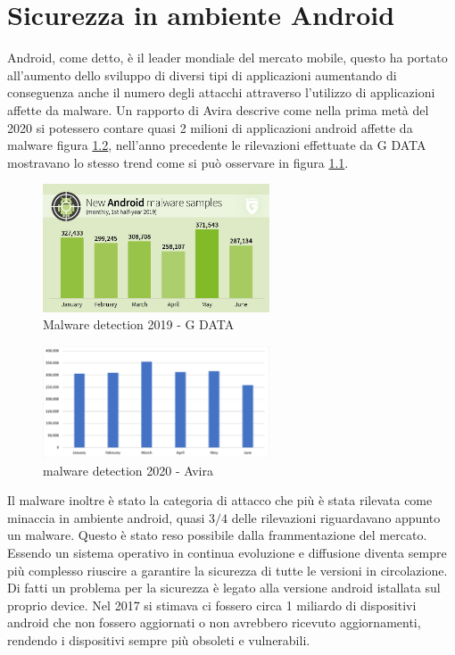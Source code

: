 \chapter{Sicurezza in ambiente Android}
\label{chap:cap3}
Android, come detto, è il leader mondiale del mercato mobile, questo ha portato all'aumento dello sviluppo di diversi tipi di applicazioni aumentando di conseguenza anche il numero degli attacchi attraverso l'utilizzo di applicazioni affette da malware. Un rapporto di Avira descrive come nella prima metà del 2020 si potessero contare quasi 2 milioni di applicazioni android affette da malware\cite{newMalwareAvira} figura \ref{fig:avira}, nell'anno precedente le rilevazioni effettuate da G DATA mostravano lo stesso trend\cite{newMalware} come si può osservare in figura \ref{fig:GSATA}. 
     \begin{figure}[h]
        \centering
        \includegraphics[width=0.6\textwidth]{imgs/capitolo3/G_DATA-Infographic-MMR-HJ1-2019-New_Android_Malware-monthly-EN-Logo.jpg}
        \caption{Malware detection 2019 - G DATA}
        \label{fig:GSATA}
\end{figure}
\FloatBarrier %
\begin{figure}[h]
        \centering
        \includegraphics[width=0.6\textwidth]{imgs/capitolo3/avira.png}
        \caption{malware detection 2020 - Avira}
        \label{fig:avira}
        \end{figure}
\FloatBarrier %
Il malware inoltre è stato la categoria di attacco che più è stata rilevata come minaccia in ambiente android, quasi $3/4$ delle rilevazioni riguardavano appunto un malware\cite{newMalwareAvira}.
Questo è stato reso possibile dalla frammentazione del mercato. Essendo un sistema operativo in continua evoluzione e diffusione diventa sempre più complesso riuscire a garantire la sicurezza di tutte le versioni in circolazione. Di fatti un problema per la sicurezza è legato alla versione android istallata sul proprio device. Nel 2017 si stimava ci fossero circa 1 miliardo di dispositivi android che non fossero aggiornati o non avrebbero ricevuto aggiornamenti, rendendo i dispositivi sempre più obsoleti e vulnerabili\cite{oneMilion}. 

